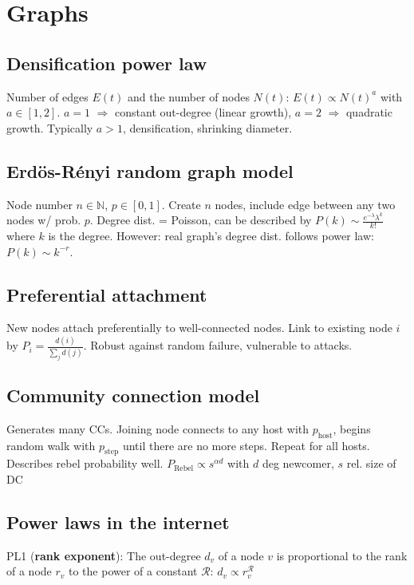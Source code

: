 \section*{Graphs}

\subsection*{Densification power law}
Number of edges $E(t)$ and the number of nodes $N(t)$: $E(t) \propto N(t)^a$ with $a \in [1,2]$. $a = 1$ $\Rightarrow$ constant out-degree (linear growth), $a = 2$ $\Rightarrow$ quadratic growth. Typically $a>1$, densification, shrinking diameter.

\subsection*{Erd\"os-Rényi random graph model}
Node number $n \in \mathbb{N}$, $p \in [0,1]$. Create $n$ nodes, include edge between any two nodes w/ prob. $p$. Degree dist. = Poisson, can be described by $P(k) \sim \frac{e^{-\lambda} \lambda^k}{k!}$ where $k$ is the degree. However: real graph's degree dist. follows power law: $P(k) \sim k^{-r}$.

\subsection*{Preferential attachment}
New nodes attach preferentially to well-connected nodes. Link to existing node $i$ by $P_i = \frac{d(i)}{\sum_j d(j)}$. Robust against random failure, vulnerable to attacks.

\subsection*{Community connection model}
Generates many CCs. Joining node connects to any host with $p_\text{host}$, begins random walk with $p_\text{step}$ until there are no more steps. Repeat for all hosts. Describes  rebel probability well. $P_\text{Rebel} \propto s^{\alpha d}$ with $d$ deg newcomer, $s$ rel. size of DC

\subsection*{Power laws in the internet}
PL1 (\textbf{rank exponent}): The out-degree $d_v$ of a node $v$ is proportional to the rank of a node $r_v$ to the power of a constant $\mathcal{R}$: $d_v \propto r_v^\mathcal{R}$

